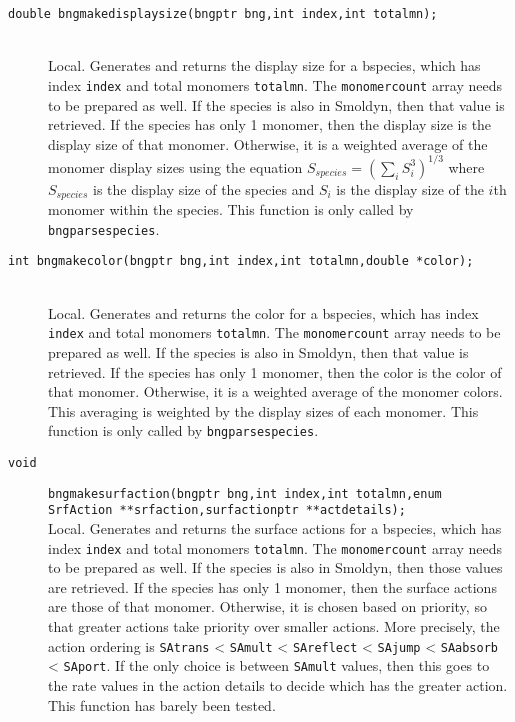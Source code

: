 \documentclass {book}
\begin{document}
\begin{description}
\item[\texttt{double bngmakedisplaysize(bngptr bng,int index,int totalmn);}]
\hfill \\
Local. Generates and returns the display size for a bspecies, which has index \texttt{index} and total monomers \texttt{totalmn}. The \texttt{monomercount} array needs to be prepared as well. If the species is also in Smoldyn, then that value is retrieved. If the species has only 1 monomer, then the display size is the display size of that monomer. Otherwise, it is a weighted average of the monomer display sizes using the equation
$S_{species} = (\sum_{i} S_i^{3})^{1/3}$
where $S_{species}$ is the display size of the species and $S_i$ is the display size of the $i$th monomer within the species. This function is only called by \texttt{bngparsespecies}.

\item[\texttt{int bngmakecolor(bngptr bng,int index,int totalmn,double *color);}]
\hfill \\
Local. Generates and returns the color for a bspecies, which has index \texttt{index} and total monomers \texttt{totalmn}. The \texttt{monomercount} array needs to be prepared as well. If the species is also in Smoldyn, then that value is retrieved. If the species has only 1 monomer, then the color is the color of that monomer. Otherwise, it is a weighted average of the monomer colors. This averaging is weighted by the display sizes of each monomer. This function is only called by \texttt{bngparsespecies}.

\item[\texttt{void}]
\texttt{bngmakesurfaction(bngptr bng,int index,int totalmn,enum SrfAction **srfaction,surfactionptr **actdetails);}
\hfill \\
Local. Generates and returns the surface actions for a bspecies, which has index \texttt{index} and total monomers \texttt{totalmn}. The \texttt{monomercount} array needs to be prepared as well. If the species is also in Smoldyn, then those values are retrieved. If the species has only 1 monomer, then the surface actions are those of that monomer. Otherwise, it is chosen based on priority, so that greater actions take priority over smaller actions. More precisely, the action ordering is \texttt{SAtrans} < \texttt{SAmult} < \texttt{SAreflect} < \texttt{SAjump} < \texttt{SAabsorb} < \texttt{SAport}. If the only choice is between \texttt{SAmult} values, then this goes to the rate values in the action details to decide which has the greater action. This function has barely been tested.


\end{description}
\end{document}
